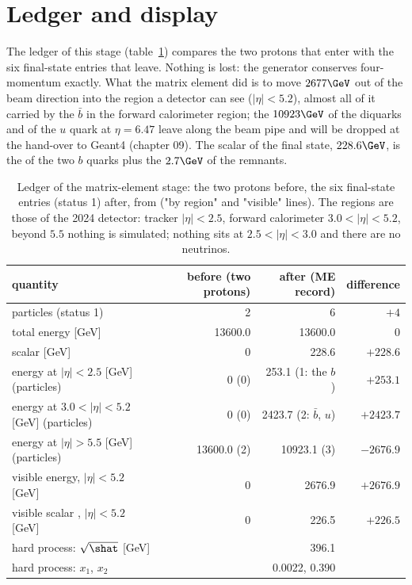 \section{Ledger and display}

The ledger of this stage (table~\ref{tab:01_ledger}) compares the two protons that enter with the six
final-state entries that leave. Nothing is lost: the generator conserves four-momentum exactly. What the
matrix element did is to move $2677\GeV$ out of the beam direction into the region a detector can see
($|\eta| < 5.2$), almost all of it carried by the $\bar b$ in the forward calorimeter region; the
$10923\GeV$ of the diquarks and of the $u$ quark at $\eta = 6.47$ leave along the beam pipe and will be
dropped at the hand-over to Geant4 (chapter 09). The scalar \pt{} of the final state, $228.6\GeV$, is the
\pt{} of the two $b$ quarks plus the $2.7\GeV$ of the remnants.

\begin{table}[htb]
\centering\small
\caption{Ledger of the matrix-element stage: the two protons before, the six final-state entries
(status 1) after, from  ("by region" and "visible" lines). The regions are those of
the 2024 detector: tracker $|\eta| < 2.5$, forward calorimeter $3.0 < |\eta| < 5.2$, beyond $5.5$ nothing
is simulated; nothing sits at $2.5 < |\eta| < 3.0$ and there are no neutrinos.}
\label{tab:01_ledger}
\begin{tabular}{lrrr}
\toprule
quantity & before (two protons) & after (ME record) & difference \\
\midrule
particles (status 1) & 2 & 6 & $+4$ \\
total energy [GeV] & 13600.0 & 13600.0 & 0 \\
scalar \pt{} [GeV] & 0 & 228.6 & $+228.6$ \\
energy at $|\eta| < 2.5$ [GeV] (particles) & 0 (0) & 253.1 (1: the $b$) & $+253.1$ \\
energy at $3.0 < |\eta| < 5.2$ [GeV] (particles) & 0 (0) & 2423.7 (2: $\bar b$, $u$) & $+2423.7$ \\
energy at $|\eta| > 5.5$ [GeV] (particles) & 13600.0 (2) & 10923.1 (3) & $-2676.9$ \\
visible energy, $|\eta| < 5.2$ [GeV] & 0 & 2676.9 & $+2676.9$ \\
visible scalar \pt{}, $|\eta| < 5.2$ [GeV] & 0 & 226.5 & $+226.5$ \\
\midrule
hard process: $\sqrt{\shat}$ [GeV] & & 396.1 & \\
hard process: $x_1$, $x_2$ & & 0.0022, 0.390 & \\
\bottomrule
\end{tabular}
\end{table}

